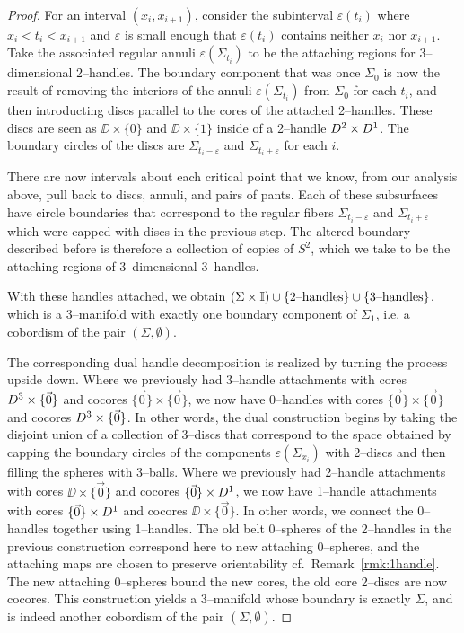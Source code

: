 \begin{proof}
	For an interval $(x_i,x_{i+1})$, consider the subinterval $\varepsilon(t_i)$ where $x_i<t_i<x_{i+1}$ and $\varepsilon$ is small enough that $\varepsilon(t_i)$ contains neither $x_i$ nor $x_{i+1}$.
	Take the associated regular annuli $\varepsilon(\Sigma_{t_i})$ to be the attaching regions for 3--dimensional 2--handles.
	The boundary component that was once $\Sigma_0$ is now the result of removing the interiors of the annuli $\varepsilon(\Sigma_{t_i})$ from $\Sigma_0$ for each $t_i$, and then introducting discs parallel to the cores of the attached 2--handles.
	These discs are seen as $\DD\times\{0\}$ and $\DD\times\{1\}$ inside of a 2--handle $D^2\times D^1$.
	The boundary circles of the discs are $\Sigma_{t_i-\varepsilon}$ and $\Sigma_{t_i+\varepsilon}$ for each $i$.
	
	There are now intervals about each critical point that we know, from our analysis above, pull back to discs, annuli, and pairs of pants.
	Each of these subsurfaces have circle boundaries that correspond to the regular fibers $\Sigma_{t_i-\varepsilon}$ and $\Sigma_{t_i+\varepsilon}$ which were capped with discs in the previous step.
	The altered boundary described before is therefore a collection of copies of $S^2$, which we take to be the attaching regions of 3--dimensional 3--handles.
	
	With these handles attached, we obtain $(\Sigma\times\mathbb{I})\cup\{\textrm{2--handles}\}\cup\{\textrm{3--handles}\}$, which is a 3--manifold with exactly one boundary component of $\Sigma_1$, i.e. a cobordism of the pair $(\Sigma,\emptyset)$.
	
	The corresponding dual handle decomposition is realized by turning the process upside down.
	Where we previously had 3--handle attachments with cores $D^3\times\{\vec{0}\}$ and cocores $\{\vec{0}\}\times\{\vec{0}\}$, we now have 0--handles with cores $\{\vec{0}\}\times\{\vec{0}\}$ and cocores $D^3\times\{\vec{0}\}$.
	In other words, the dual construction begins by taking the disjoint union of a collection of 3--discs that correspond to the space obtained by capping the boundary circles of the components $\varepsilon(\Sigma_{x_i})$ with 2--discs and then filling the spheres with 3--balls.
	Where we previously had 2--handle attachments with cores $\DD\times\{\vec{0}\}$ and cocores $\{\vec{0}\}\times D^1$, we now have 1--handle attachments with cores $\{\vec{0}\}\times D^1$ and cocores $\DD\times\{\vec{0}\}$.
	In other words, we connect the 0--handles together using 1--handles.
	The old belt 0--spheres of the 2--handles in the previous construction correspond here to new attaching 0--spheres, and the attaching maps are chosen to preserve orientability cf.\ Remark~\ref{rmk:1handle}.
	The new attaching 0--spheres bound the new cores, the old core 2--discs are now cocores.
	This construction yields a 3--manifold whose boundary is exactly $\Sigma$, and is indeed another cobordism of the pair $(\Sigma,\emptyset)$.
	

\end{proof}
